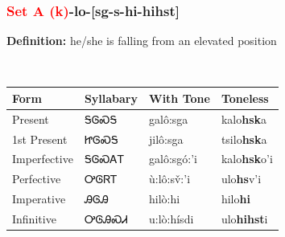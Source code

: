 \subsubsection*{\textcolor{Red}{Set A (k)}{-}\textbf{lo}{-}[sg-s-hi-hihst]}
\nopagebreak
\textbf{Definition: } he/she is falling from an elevated position
\\[0.5em]
\begin{tabularx}{\textwidth}{l X X X}%
\toprule%
\textbf{Form}&\textbf{Syllabary}&\textbf{With Tone}&\textbf{Toneless}\\%
\midrule%
Present&ᎦᎶᏍᎦ&galô:sga&kalo\textbf{hsk}a\\%
1st Present&ᏥᎶᏍᎦ&jilô:sga&tsilo\textbf{hsk}a\\%
Imperfective&ᎦᎶᏍᎪᎢ&galô:sgó:’i&kalo\textbf{hsk}o'i\\%
Perfective&ᎤᎶᏒᎢ&ù:lô:sv̌:’i&ulo\textbf{hs}v'i\\%
Imperative&ᎯᎶᎯ&hilò:hi&hilo\textbf{hi}\\%
Infinitive&ᎤᎶᎯᏍᏗ&u:lò:hísdi&ulo\textbf{hihst}i\\%
\bottomrule%
\end{tabularx}
\\[1em]
